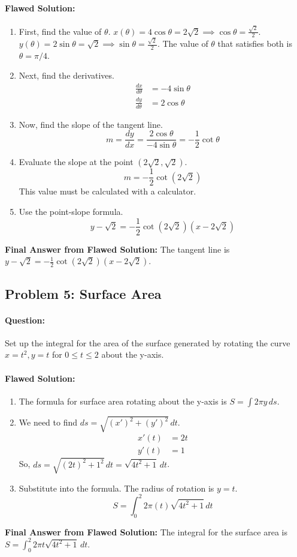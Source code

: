 \documentclass{article}
\begin{document}
\paragraph{Flawed Solution:}
\begin{enumerate}
    \item First, find the value of $\theta$.
    $x(\theta) = 4\cos\theta = 2\sqrt{2} \implies \cos\theta = \frac{\sqrt{2}}{2}$.
    $y(\theta) = 2\sin\theta = \sqrt{2} \implies \sin\theta = \frac{\sqrt{2}}{2}$.
    The value of $\theta$ that satisfies both is $\theta = \pi/4$.
    \item Next, find the derivatives.
    \begin{align*}
    \frac{dx}{d\theta} &= -4\sin\theta \\
    \frac{dy}{d\theta} &= 2\cos\theta
    \end{align*}
    \item Now, find the slope of the tangent line.
    \[ m = \frac{dy}{dx} = \frac{2\cos\theta}{-4\sin\theta} = -\frac{1}{2}\cot\theta \]
    \item Evaluate the slope at the point $(2\sqrt{2}, \sqrt{2})$.
    \[ m = -\frac{1}{2} \cot(2\sqrt{2}) \]
    This value must be calculated with a calculator.
    \item Use the point-slope formula.
    \[ y - \sqrt{2} = -\frac{1}{2}\cot(2\sqrt{2}) (x - 2\sqrt{2}) \]
\end{enumerate}
\textbf{Final Answer from Flawed Solution:} The tangent line is $y - \sqrt{2} = -\frac{1}{2}\cot(2\sqrt{2}) (x - 2\sqrt{2})$.

\subsection{Problem 5: Surface Area}
\paragraph{Question:} Set up the integral for the area of the surface generated by rotating the curve $x = t^2, y = t$ for $0 \le t \le 2$ about the y-axis.

\paragraph{Flawed Solution:}
\begin{enumerate}
    \item The formula for surface area rotating about the y-axis is $S = \int 2\pi y \, ds$.
    \item We need to find $ds = \sqrt{(x')^2 + (y')^2} \, dt$.
    \begin{align*}
    x'(t) &= 2t \\
    y'(t) &= 1
    \end{align*}
    So, $ds = \sqrt{(2t)^2 + 1^2} \, dt = \sqrt{4t^2+1} \, dt$.
    \item Substitute into the formula. The radius of rotation is $y=t$.
    \[ S = \int_0^2 2\pi (t) \sqrt{4t^2+1} \, dt \]
\end{enumerate}
\textbf{Final Answer from Flawed Solution:} The integral for the surface area is $S = \int_0^2 2\pi t \sqrt{4t^2+1} \, dt$.
\end{document}
